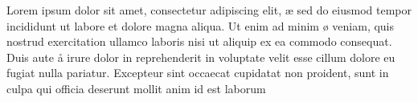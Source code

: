 \documentclass[../template/template.tex]{subfiles}
\begin{document}
Lorem ipsum dolor sit amet, consectetur adipiscing elit, æ sed do eiusmod tempor incididunt ut labore et dolore magna aliqua. Ut enim ad minim ø veniam, quis nostrud exercitation ullamco laboris nisi ut aliquip ex ea commodo consequat. Duis aute å irure dolor in reprehenderit in voluptate velit esse cillum dolore eu fugiat nulla pariatur. Excepteur sint occaecat cupidatat non proident, sunt in culpa qui officia deserunt mollit anim id est laborum
\end{document}
